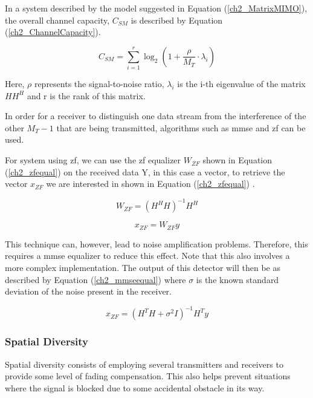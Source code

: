 \par In a system described by the model suggested in Equation (\ref{ch2_MatrixMIMO}), the overall channel capacity, $C_{SM}$ is described by Equation (\ref{ch2_ChannelCapacity}).

\begin{equation}
    \label{ch2_ChannelCapacity}
    C_{SM} = \sum_{i=1}^{r} \log_2\left( 1+ \frac{\rho}{M_{T}}\cdot\lambda_{i}\right)
\end{equation}

\par Here, $\rho$ represents the signal-to-noise ratio, $\lambda_{i}$ is the i-th eigenvalue of the matrix $HH^{H}$ and r is the rank of this matrix\cite{Kalachikov2018PerformanceModels}.

\par In order for a receiver to distinguish one data stream from the interference of the other $M_{T}-1$ that are being transmitted, algorithms such as \ac{mmse} and \ac{zf} can be used.

\par For system using \ac{zf}, we can use the \ac{zf} equalizer $W_{ZF}$ shown in Equation (\ref{ch2_zfequal}) on the received data Y, in this case a vector, to retrieve the vector $x_{ZF}$ we are interested in shown in Equation (\ref{ch2_zfequal}) \cite{Mehana2012DiversityReceivers}. 

\begin{equation}
    \label{ch2_zfequal}
    W_{ZF} = (H^{H}H)^{-1}H^{H}
\end{equation}

\begin{equation}
    \label{ch2_zfequal}
    x_{ZF} = W_{ZF}y
\end{equation}

\par This technique can, however, lead to noise amplification problems. Therefore, this requires a \ac{mmse} equalizer to reduce this effect. Note that this also involves a more complex implementation. The output of this detector will then be as described by Equation (\ref{ch2_mmseequal}) where $\sigma$ is the known standard deviation of the noise present in the receiver\cite{Kalachikov2018PerformanceModels}.

\begin{equation}
    \label{ch2_mmseequal}
    x_{ZF} = (H^{T}H+\sigma^{2}I)^{-1}H^{T}y
\end{equation}

\subsubsection{Spatial Diversity}
\par Spatial diversity consists of employing several transmitters and receivers to provide some level of fading compensation. This also helps prevent situations where the signal is blocked due to some accidental obstacle in its way\cite{Navidpour2007BERDiversity}. 

